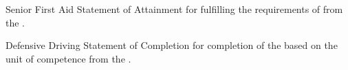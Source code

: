 \begin{qualifications}

{Senior First Aid}
{Statement of Attainment for fulfilling the requirements of
 from the
.}

{Defensive Driving}
{Statement of Completion for completion of the  based on the unit of competence
 from the
.}

\end{qualifications}

